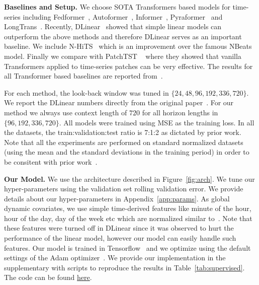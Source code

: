 \documentclass[10pt]{article} \usepackage[accepted]{tmlr}
\theoremstyle{plain}
\theoremstyle{definition}
\theoremstyle{remark}
\begin{document}

{\bf Baselines and Setup.}
We choose SOTA Transformers based models  for time-series including Fedformer~\citep{zhou2022fedformer}, Autoformer~\citep{wu2021autoformer}, Informer~\citep{zhou2021informer}, Pyraformer~\citep{liu2021pyraformer} and LongTrans~\citep{li2019enhancing}. Recently, DLinear~\citep{zeng2022transformers} showed that simple linear models can outperform the above methods and therefore DLinear serves as an important baseline. We include N-HiTS~\citep{challu2022nhits} which is an improvement over the famous NBeats~\citep{oreshkinn} model.
Finally we compare with PatchTST ~\citep{nie2022time} where they showed that vanilla Transformers applied to time-series patches can be very effective. The results for all Transformer based baselines are reported from~\citep{nie2022time}. 

For each method, the look-back window was tuned in $\{24, 48, 96, 192, 336, 720\}$. We report the DLinear numbers directly from the original paper~\citep{zeng2022transformers}. For our method we always use context length of $720$ for all horizon lengths in $\{96, 192, 336, 720\}$. All models were trained using MSE as the training loss. In all the datasets, the train:validation:test ratio is 7:1:2 as dictated by prior work. Note that all the experiments are performed on standard normalized datasets (using the mean and the standard deviations in the training period) in order to be consitent with prior work~\citep{wu2021autoformer}.

{\bf Our Model.} We use the  architecture described in Figure~\ref{fig:arch}. We tune our hyper-parameters using the validation set rolling validation error. We provide details about our hyper-parameters in Appendix~\ref{app:params}. As global dynamic covariates, we use simple time-derived features like minute of the hour, hour of the day, day of the week etc which are normalized similar to~\citep{alexandrov2020gluonts}. Note that these features were turned off in DLinear since it was observed to hurt the performance of the linear model, however our model can easily handle such features. Our model is trained in Tensorflow~\citep{abadi2016tensorflow} and we optimize using the default settings of the Adam optimizer~\citep{kingma2014adam}. We provide our implementation in the supplementary with scripts to reproduce the results in Table~\ref{tab:supervised}. The code can be found \href{https://github.com/google-research/google-research/tree/master/tide}{here}.
\end{document}

